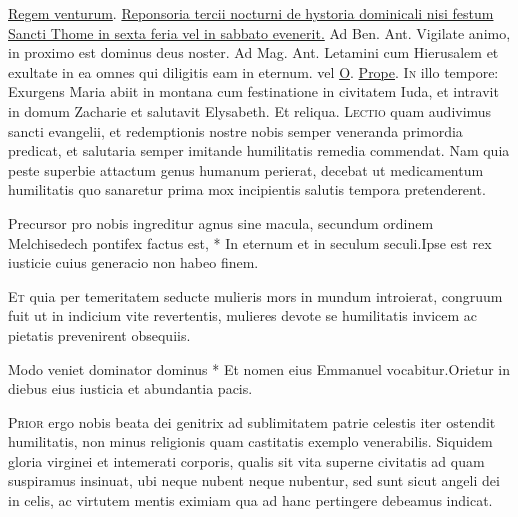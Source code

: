 \begin{multicols*}{2}
 \hyperlink{regem-venturum}{Regem venturum}.
\newline \ul{Reponsoria tercii nocturni de hystoria dominicali nisi festum Sancti Thome in sexta feria vel in sabbato evenerit.} {\color{Red} Ad Ben. Ant.} Vigilate animo, in proximo est dominus deus noster. {\color{Red} Ad Mag. Ant.} Letamini cum Hierusalem et exultate in ea omnes qui diligitis eam in eternum. {\color{Red} vel} \hyperlink{o-antiphons}{O}.
 \hyperlink{prope-est-iam-invitatorium}{Prope}.
\lettrine[lines=2]{\zallmancaps \color{Blue} I}{n} illo tempore: Exurgens Maria abiit in montana cum festinatione in civitatem Iuda, et intravit in domum Zacharie et salutavit Elysabeth. Et reliqua.
\lettrine[lines=2]{\zallmancaps \color{Red} L}{ectio} quam audivimus sancti evangelii, et redemptionis nostre nobis semper veneranda primordia predicat, et salutaria semper imitande humilitatis remedia commendat. Nam quia peste superbie attactum genus humanum perierat, decebat ut medicamentum humilitatis quo sanaretur prima mox incipientis salutis tempora pretenderent.
\begin{responsory}
{Precursor pro nobis ingreditur agnus sine macula, secundum ordinem Melchisedech pontifex factus est, * In eternum et in seculum seculi.}{Ipse est rex iusticie cuius generacio non habeo finem.}
\end{responsory}
\lettrine[lines=2]{\zallmancaps \color{Blue} E}{t} quia per temeritatem seducte mulieris mors in mundum introierat, congruum fuit ut in indicium vite revertentis, mulieres devote se humilitatis invicem ac pietatis prevenirent obsequiis.
\begin{responsory}
{Modo veniet dominator dominus * Et nomen eius Emmanuel vocabitur.}{Orietur in diebus eius iusticia et abundantia pacis.}
\end{responsory}
\lettrine[lines=2]{\zallmancaps \color{Red} P}{rior} ergo nobis beata dei genitrix ad sublimitatem patrie celestis iter ostendit humilitatis, non minus religionis quam castitatis exemplo venerabilis. Siquidem gloria virginei et intemerati corporis, qualis sit vita superne civitatis ad quam suspiramus insinuat, ubi neque nubent neque nubentur, sed sunt sicut angeli dei in celis, ac virtutem mentis eximiam qua ad hanc pertingere debeamus indicat.

\end{multicols*}
